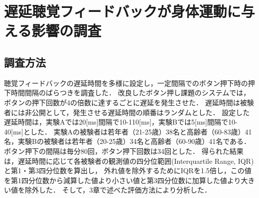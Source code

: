 \section{遅延聴覚フィードバックが身体運動に与える影響の調査}
\subsection{調査方法}
聴覚フィードバックの遅延時間を多様に設定し，一定間隔でのボタン押下時の押下時間間隔のばらつきを調査した．
改良したボタン押し課題のシステムでは，ボタンの押下回数が4の倍数に達するごとに遅延を発生させた．
遅延時間は被験者には非公開として，発生させる遅延時間の順番はランダムとした．
設定した遅延時間は，実験Aでは20[ms]間隔で10-110[ms]，実験Bでは5[ms]間隔で10-40[ms]とした．
実験Aの被験者は若年者（21-25歳）38名と高齢者（60-83歳）41名，実験Bの被験者は若年者（20-25歳）34名と高齢者（60-90歳）41名である．
ボタン押下の間隔は毎分80回，ボタン押下回数は34回とした．
得られた結果は，遅延時間に応じて各被験者の観測値の四分位範囲(Interquartile Range, IQR)と第1・第3四分位数を算出し，
外れ値を除外するためにIQRを1.5倍し，この値を第1四分位数から減算した値より小さい値と第3四分位数に加算した値より大きい値を除外した．
そして，3章で述べた評価方法により分析した．

